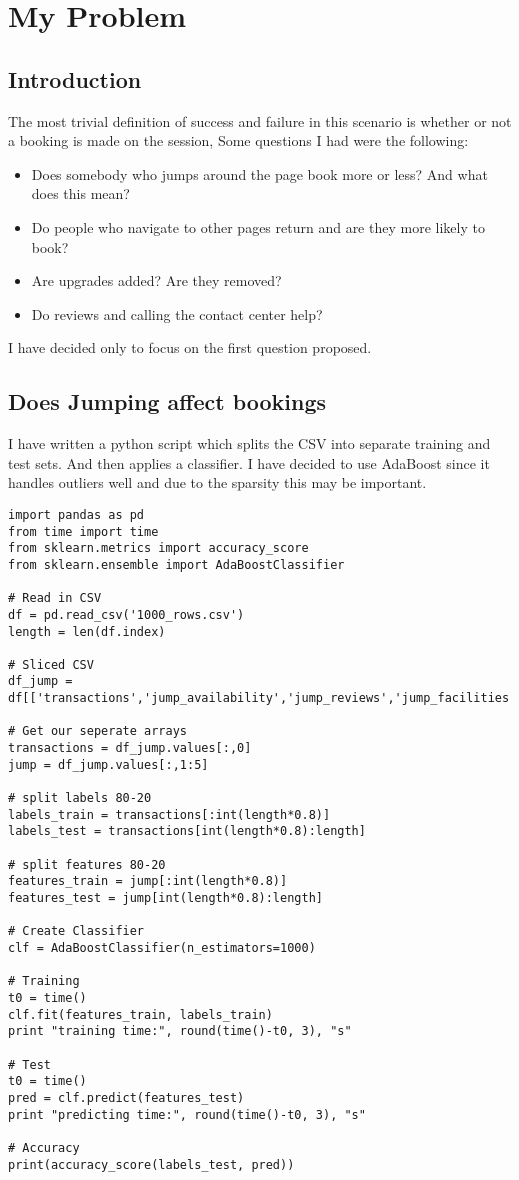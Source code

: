 \documentclass[a4paper]{report}
\begin{document}
\chapter{My Problem}
\section{Introduction}
The most trivial definition of success and failure in this scenario is whether or not a booking is made on the session, Some questions I had were the following:

\begin{itemize}
\item Does somebody who jumps around the page book more or less? And what does this mean?
\item Do people who navigate to other pages return and are they more likely to book?
\item Are upgrades added? Are they removed?
\item Do reviews and calling the contact center help?
\end{itemize}

I have decided only to focus on the first question proposed.

\section{Does Jumping affect bookings}
I have written a python script which splits the CSV into separate training and test sets. And then applies a classifier. I have decided to use AdaBoost since it handles outliers well and due to the sparsity this may be important.

\begin{lstlisting}
import pandas as pd
from time import time
from sklearn.metrics import accuracy_score
from sklearn.ensemble import AdaBoostClassifier

# Read in CSV
df = pd.read_csv('1000_rows.csv')
length = len(df.index)

# Sliced CSV
df_jump = df[['transactions','jump_availability','jump_reviews','jump_facilities','jump_info']]

# Get our seperate arrays
transactions = df_jump.values[:,0]
jump = df_jump.values[:,1:5]

# split labels 80-20
labels_train = transactions[:int(length*0.8)]
labels_test = transactions[int(length*0.8):length]

# split features 80-20
features_train = jump[:int(length*0.8)]
features_test = jump[int(length*0.8):length]

# Create Classifier
clf = AdaBoostClassifier(n_estimators=1000)

# Training
t0 = time()
clf.fit(features_train, labels_train)
print "training time:", round(time()-t0, 3), "s"

# Test
t0 = time()
pred = clf.predict(features_test)
print "predicting time:", round(time()-t0, 3), "s"

# Accuracy
print(accuracy_score(labels_test, pred))
\end{lstlisting}
\end{document}

